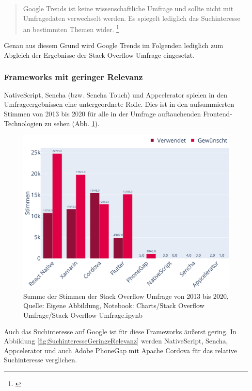 \begin{quotation}
Google Trends ist keine wissenschaftliche Umfrage und sollte nicht mit Umfragedaten verwechselt werden. Es spiegelt lediglich das Suchinteresse an bestimmten Themen wider. \footnote{\cite{GoogleTrendsHilfe}}
\end{quotation}

Genau aus diesem Grund wird Google Trends im Folgenden lediglich zum Abgleich der Ergebnisse der Stack Overflow Umfrage eingesetzt. 

\subsubsection{Frameworks mit geringer Relevanz}

NativeScript, Sencha (bzw. Sencha Touch) und Appcelerator spielen in den Umfrageergebnissen eine untergeordnete Rolle. Dies ist in den aufsummierten Stimmen von 2013 bis 2020 für alle in der Umfrage auftauchenden Frontend-Technologien zu sehen (Abb. \ref{fig:SummeDerStimmen}).

\begin{figure}[H]
	\centering
    \includegraphics[width=1.0\textwidth]{Charts/Stack Overflow Umfrage/Summe der Stimmen.pdf}
	\caption[Stimmen der Stack Overflow Umfrage von 2013 bis 2020]{Summe der Stimmen der Stack Overflow Umfrage von 2013 bis 2020, Quelle: Eigene Abbildung, Notebook: Charts/Stack Overflow Umfrage/Stack Overflow Umfrage.ipynb}
	\label{fig:SummeDerStimmen}
\end{figure}

Auch das Suchinteresse auf Google ist für diese Frameworks äußerst gering. In Abbildung \ref{fig:SuchinteresseGeringeRelevanz} werden NativeScript, Sencha, Appcelerator und auch Adobe PhoneGap mit Apache Cordova für das relative Suchinteresse verglichen. 


